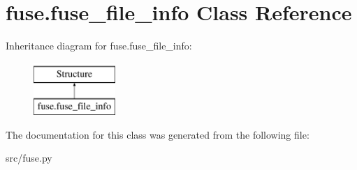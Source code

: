 \hypertarget{classfuse_1_1fuse__file__info}{\section{fuse.\-fuse\-\_\-file\-\_\-info Class Reference}
\label{classfuse_1_1fuse__file__info}
}
Inheritance diagram for fuse.\-fuse\-\_\-file\-\_\-info\-:\begin{figure}[H]
\begin{center}
\leavevmode
\includegraphics[height=2.000000cm]{classfuse_1_1fuse__file__info}
\end{center}
\end{figure}


The documentation for this class was generated from the following file\-:\begin{DoxyCompactItemize}
\item 
src/fuse.\-py\end{DoxyCompactItemize}
